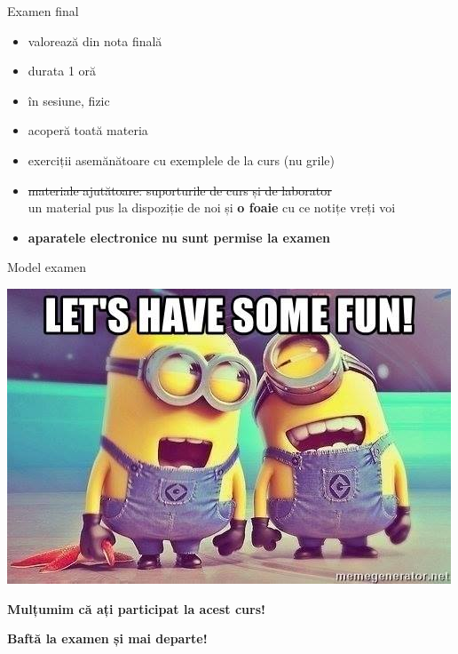 \documentclass[xcolor=pdftex,romanian,colorlinks]{beamer}
\begin{document}
\begin{frame}{Examen final}
\begin{itemize}
	\item valorează  din nota finală
	\item durata 1 oră
	\item în sesiune, fizic
	\item acoperă toată materia
	\item exerciții asemănătoare cu exemplele de la curs (nu grile)
	\item \sout{materiale ajutătoare: suporturile de curs și de laborator} \\
		un material pus la dispoziție de noi și \textbf{o foaie} cu ce notițe vreți voi
 	\item \textbf{aparatele electronice nu sunt permise la examen}
\end{itemize}
\end{frame}

\begin{frame}{Model examen}

\begin{center}
\includegraphics[scale=.4]{images/fun.jpeg}
\end{center}
\end{frame}


\begin{frame}
  \vfill
  \centering

\textbf{Mulțumim că ați participat la acest curs!}

\textbf{Baftă la examen și mai departe!}

  \vfill
\end{frame}
\end{document}
